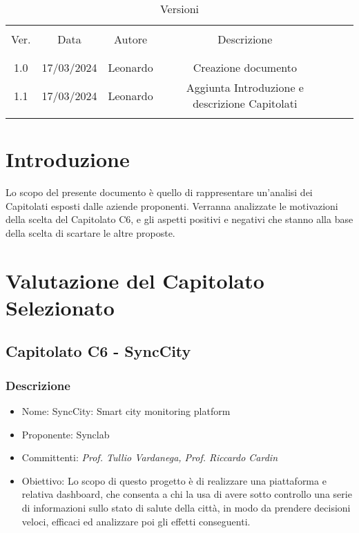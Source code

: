 \documentclass[italian,12pt]{article} %
\begin{document}


\newpage



\begin{table}[!h]
	\caption{Versioni}
	\begin{center}
		\begin{tabular}{ c c c c c c }
			\hline \\[-2ex]
			Ver. & Data & Autore & Descrizione \\
			\\[-2ex] \hline \\[-1.5ex]
			1.0  & 17/03/2024 & Leonardo & Creazione documento \\
			1.1 & 17/03/2024 & Leonardo & Aggiunta Introduzione e descrizione Capitolati \\

			\\[-1.5ex] \hline
		\end{tabular}
	\end{center}
\end{table}

\newpage

\tableofcontents

\newpage

\section{Introduzione}
Lo scopo del presente documento è quello di rappresentare un'analisi dei Capitolati esposti dalle aziende proponenti. Verranna analizzate le motivazioni della scelta del Capitolato C6, e gli aspetti positivi e negativi che stanno alla base della scelta di scartare le altre proposte.



\section{Valutazione del Capitolato Selezionato}

\subsection{Capitolato C6 - SyncCity}

\subsubsection{Descrizione}
\begin{itemize}
	\item Nome: SyncCity: Smart city monitoring platform
	\item Proponente: Synclab
	\item Committenti: {\it Prof. Tullio Vardanega, Prof. Riccardo Cardin}
	\item Obiettivo: Lo scopo di questo progetto è di realizzare una piattaforma e relativa dashboard, che consenta a chi la usa di avere sotto controllo una serie di informazioni sullo stato di salute della città, in modo da prendere decisioni veloci, efficaci ed analizzare poi gli effetti conseguenti.
\end{itemize}
\end{document}
